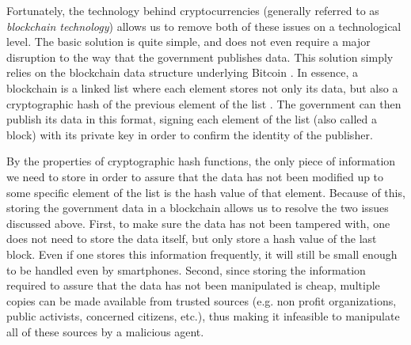 Fortunately, the technology behind cryptocurrencies (generally referred to as \emph{blockchain technology}) allows us to remove both of these issues on a technological level. The basic solution is quite simple, and does not even require a major disruption to the way that the government publishes data. This solution simply relies on the blockchain data structure underlying Bitcoin \cite{whitepaper,bitcoinbook}. In essence, a blockchain is a linked list where each element stores not only its data, but also a cryptographic hash of the previous element of the list \cite{bitcoinbook}. The government can then publish its data in this format, signing each element of the list (also called a block) with its private key in order to confirm the identity of the publisher.

By the properties of cryptographic hash functions, the only piece of information we need to store in order to assure that the data has not been modified up to some specific element of the list is the hash value of that element. Because of this, storing the government data in a blockchain allows us to resolve the two issues discussed above. First, to make sure the data has not been tampered with, one does not need to store the data itself, but only store a hash value of the last block. Even if one stores this information frequently, it will still be small enough to be handled even by smartphones. Second, since storing the information required to assure that the data has not been manipulated is cheap, multiple copies can be made available from trusted sources (e.g. non profit organizations, public activists, concerned citizens, etc.), thus making it infeasible to manipulate all of these sources by a malicious agent.






